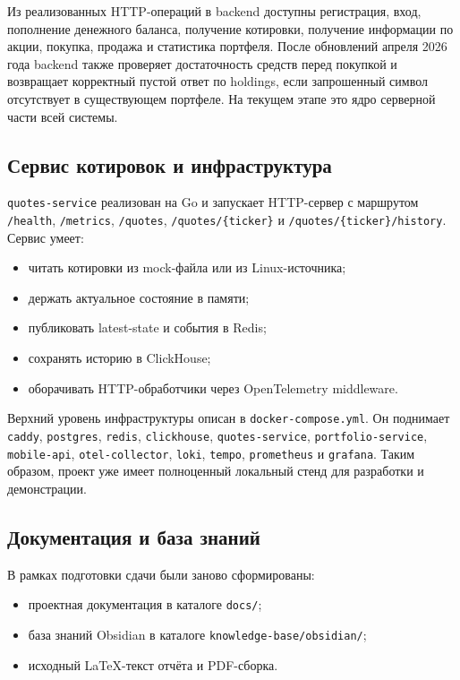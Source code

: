 \documentclass[12pt,a4paper]{article}
\begin{document}
Из реализованных HTTP-операций в backend доступны регистрация, вход, пополнение денежного баланса, получение котировки, получение информации по акции, покупка, продажа и статистика портфеля. После обновлений апреля 2026 года backend также проверяет достаточность средств перед покупкой и возвращает корректный пустой ответ по holdings, если запрошенный символ отсутствует в существующем портфеле. На текущем этапе это ядро серверной части всей системы.

\subsection{Сервис котировок и инфраструктура}

\texttt{quotes-service} реализован на Go и запускает HTTP-сервер с маршрутом \texttt{/health}, \texttt{/metrics}, \texttt{/quotes}, \texttt{/quotes/\{ticker\}} и \texttt{/quotes/\{ticker\}/history}. Сервис умеет:

\begin{itemize}[leftmargin=1.2cm]
    \item читать котировки из mock-файла или из Linux-источника;
    \item держать актуальное состояние в памяти;
    \item публиковать latest-state и события в Redis;
    \item сохранять историю в ClickHouse;
    \item оборачивать HTTP-обработчики через OpenTelemetry middleware.
\end{itemize}

Верхний уровень инфраструктуры описан в \texttt{docker-compose.yml}. Он поднимает \texttt{caddy}, \texttt{postgres}, \texttt{redis}, \texttt{clickhouse}, \texttt{quotes-service}, \texttt{portfolio-service}, \texttt{mobile-api}, \texttt{otel-collector}, \texttt{loki}, \texttt{tempo}, \texttt{prometheus} и \texttt{grafana}. Таким образом, проект уже имеет полноценный локальный стенд для разработки и демонстрации.

\subsection{Документация и база знаний}

В рамках подготовки сдачи были заново сформированы:

\begin{itemize}[leftmargin=1.2cm]
    \item проектная документация в каталоге \texttt{docs/};
    \item база знаний Obsidian в каталоге \texttt{knowledge-base/obsidian/};
    \item исходный LaTeX-текст отчёта и PDF-сборка.
\end{itemize}
\end{document}
